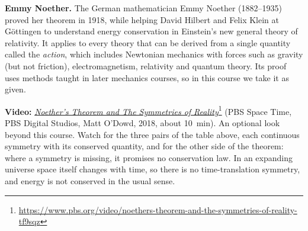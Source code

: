\documentclass[11pt,a4paper]{article}
\begin{document}
\begin{aside}
\textbf{Emmy Noether.} The German mathematician Emmy Noether (1882--1935) proved her theorem in 1918,
while helping David Hilbert and Felix Klein at G\"ottingen to understand energy conservation in
Einstein's new general theory of relativity. It applies to every theory that can be derived from a
single quantity called the \emph{action}, which includes Newtonian mechanics with forces such as
gravity (but not friction), electromagnetism, relativity and quantum theory. Its proof uses methods taught in later mechanics courses, so in this course we take it
as given.
\par\smallskip
\textbf{Video:}
\href{https://www.pbs.org/video/noethers-theorem-and-the-symmetries-of-reality-tf9sqz}{\emph{Noether's
Theorem and The Symmetries of
Reality}}\footnote{\url{https://www.pbs.org/video/noethers-theorem-and-the-symmetries-of-reality-tf9sqz}}
(PBS Space Time, PBS Digital Studios, Matt O'Dowd, 2018, about 10~min). An optional look beyond
this course. Watch for the three pairs of the table above, each continuous symmetry with its
conserved quantity, and for the other side of the theorem: where a symmetry is missing, it
promises no conservation law. In an expanding universe space itself changes with time, so there is
no time-translation symmetry, and energy is not conserved in the usual sense.
\end{aside}
\end{document}
